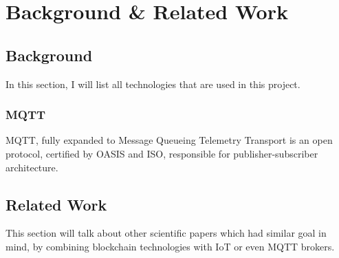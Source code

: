 \chapter{Background \& Related Work}
\section{Background}
In this section, I will list all technologies that are used in this project.
\subsection{MQTT}
MQTT, fully expanded to Message Queueing Telemetry Transport is an open protocol, certified by OASIS and ISO, responsible for publisher-subscriber architecture.
\section{Related Work}
This section will talk about other scientific papers which had similar goal in mind, by combining blockchain technologies with IoT or even MQTT brokers.

